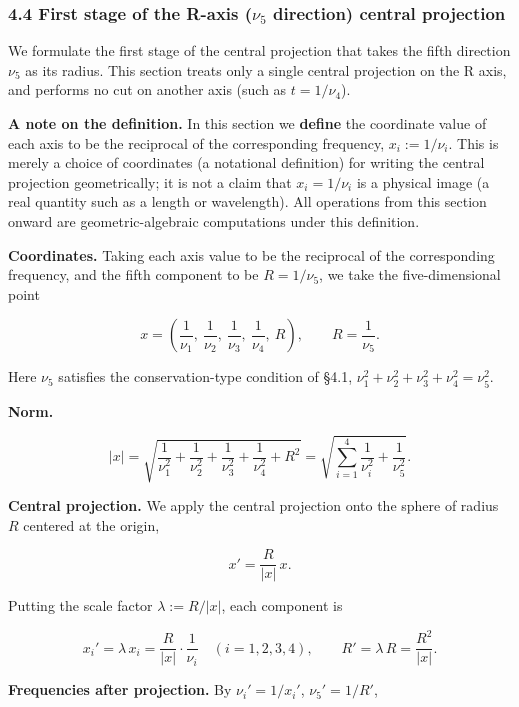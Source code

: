 \documentclass[
]{article}
\begin{document}
\subsubsection{\texorpdfstring{4.4 First stage of the R-axis (\(\nu_5\)
direction) central
projection}{4.4 First stage of the R-axis (\textbackslash nu\_5 direction) central projection}}\label{first-stage-of-the-r-axis-nu_5-direction-central-projection}

We formulate the first stage of the central projection that takes the
fifth direction \(\nu_5\) as its radius. This section treats only a
single central projection on the R axis, and performs no cut on another
axis (such as \(t=1/\nu_4\)).

\textbf{A note on the definition.} In this section we \textbf{define}
the coordinate value of each axis to be the reciprocal of the
corresponding frequency, \(x_i:=1/\nu_i\). This is merely a choice of
coordinates (a notational definition) for writing the central projection
geometrically; it is not a claim that \(x_i=1/\nu_i\) is a physical
image (a real quantity such as a length or wavelength). All operations
from this section onward are geometric-algebraic computations under this
definition.

\textbf{Coordinates.} Taking each axis value to be the reciprocal of the
corresponding frequency, and the fifth component to be \(R=1/\nu_5\), we
take the five-dimensional point

\[x = \left(\frac{1}{\nu_1},\ \frac{1}{\nu_2},\ \frac{1}{\nu_3},\ \frac{1}{\nu_4},\ R\right),\qquad R=\frac{1}{\nu_5}.\]

Here \(\nu_5\) satisfies the conservation-type condition of §4.1,
\(\nu_1^2+\nu_2^2+\nu_3^2+\nu_4^2=\nu_5^2\).

\textbf{Norm.}

\[|x| = \sqrt{\frac{1}{\nu_1^2}+\frac{1}{\nu_2^2}+\frac{1}{\nu_3^2}+\frac{1}{\nu_4^2}+R^2} = \sqrt{\sum_{i=1}^{4}\frac{1}{\nu_i^2}+\frac{1}{\nu_5^2}}.\]

\textbf{Central projection.} We apply the central projection onto the
sphere of radius \(R\) centered at the origin,

\[x' = \frac{R}{|x|}\,x.\]

Putting the scale factor \(\lambda := R/|x|\), each component is

\[x_i' = \lambda\,x_i = \frac{R}{|x|}\cdot\frac{1}{\nu_i}\quad(i=1,2,3,4),\qquad R' = \lambda\,R = \frac{R^2}{|x|}.\]

\textbf{Frequencies after projection.} By \(\nu_i'=1/x_i'\),
\(\nu_5'=1/R'\),
\end{document}
